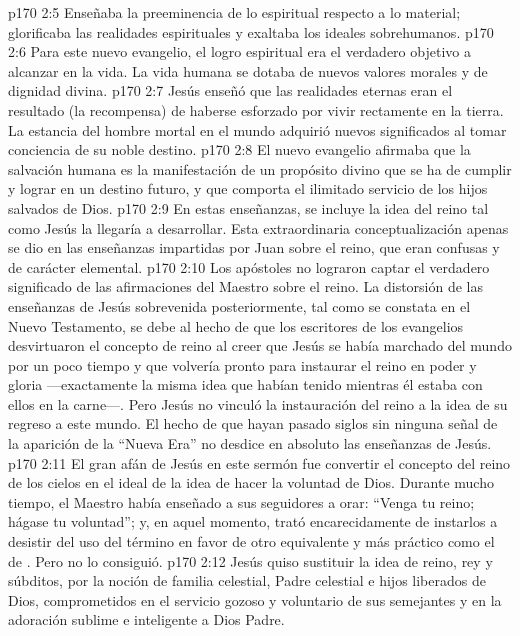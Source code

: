 \vs p170 2:5 Enseñaba la preeminencia de lo espiritual respecto a lo material; glorificaba las realidades espirituales y exaltaba los ideales sobrehumanos.
\vs p170 2:6 Para este nuevo evangelio, el logro espiritual era el verdadero objetivo a alcanzar en la vida. La vida humana se dotaba de nuevos valores morales y de dignidad divina.
\vs p170 2:7 Jesús enseñó que las realidades eternas eran el resultado (la recompensa) de haberse esforzado por vivir rectamente en la tierra. La estancia del hombre mortal en el mundo adquirió nuevos significados al tomar conciencia de su noble destino.
\vs p170 2:8 El nuevo evangelio afirmaba que la salvación humana es la manifestación de un propósito divino que se ha de cumplir y lograr en un destino futuro, y que comporta el ilimitado servicio de los hijos salvados de Dios.
\vs p170 2:9 \pc En estas enseñanzas, se incluye la idea del reino tal como Jesús la llegaría a desarrollar. Esta extraordinaria conceptualización apenas se dio en las enseñanzas impartidas por Juan sobre el reino, que eran confusas y de carácter elemental.
\vs p170 2:10 Los apóstoles no lograron captar el verdadero significado de las afirmaciones del Maestro sobre el reino. La distorsión de las enseñanzas de Jesús sobrevenida posteriormente, tal como se constata en el Nuevo Testamento, se debe al hecho de que los escritores de los evangelios desvirtuaron el concepto de reino al creer que Jesús se había marchado del mundo por un poco tiempo y que volvería pronto para instaurar el reino en poder y gloria ---exactamente la misma idea que habían tenido mientras él estaba con ellos en la carne---. Pero Jesús no vinculó la instauración del reino a la idea de su regreso a este mundo. El hecho de que hayan pasado siglos sin ninguna señal de la aparición de la “Nueva Era” no desdice en absoluto las enseñanzas de Jesús.
\vs p170 2:11 El gran afán de Jesús en este sermón fue convertir el concepto del reino de los cielos en el ideal de la idea de hacer la voluntad de Dios. Durante mucho tiempo, el Maestro había enseñado a sus seguidores a orar: “Venga tu reino; hágase tu voluntad”; y, en aquel momento, trató encarecidamente de instarlos a desistir del uso del término  en favor de otro equivalente y más práctico como el de . Pero no lo consiguió.
\vs p170 2:12 Jesús quiso sustituir la idea de reino, rey y súbditos, por la noción de familia celestial, Padre celestial e hijos liberados de Dios, comprometidos en el servicio gozoso y voluntario de sus semejantes y en la adoración sublime e inteligente a Dios Padre.
